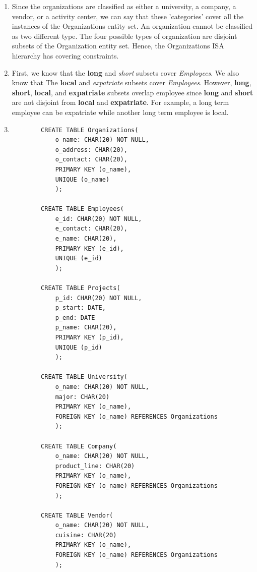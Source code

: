\begin{enumerate}[label={(\alph*)}]
    \item Since the organizations are classified as either a university, a company, a vendor, or a activity center, we can say that these 'categories' cover all the instances of the Organizations entity set. An organization cannot be classified as two different type. The four possible types of organization are disjoint subsets of the Organization entity set. Hence, the Organizations ISA hierarchy has covering constraints. 
    
    \item First, we know that the \textbf{long} and \textit{short} subsets cover \textit{Employees}. We also know that The \textbf{local} and \textit{expatriate} subsets cover \textit{Employees}. However, \textbf{long}, \textbf{short}, \textbf{local}, and \textbf{expatriate} subsets overlap employee since \textbf{long} and \textbf{short} are not disjoint from \textbf{local} and \textbf{expatriate}. For example, a long term employee can be expatriate while another long term employee is local. 
    
    \item \begin{verbatim}
        CREATE TABLE Organizations(
            o_name: CHAR(20) NOT NULL,
            o_address: CHAR(20),
            o_contact: CHAR(20),
            PRIMARY KEY (o_name),
            UNIQUE (o_name)
            );
        
        CREATE TABLE Employees(
            e_id: CHAR(20) NOT NULL,
            e_contact: CHAR(20),
            e_name: CHAR(20),
            PRIMARY KEY (e_id),
            UNIQUE (e_id)
            );
            
        CREATE TABLE Projects(
            p_id: CHAR(20) NOT NULL,
            p_start: DATE,
            p_end: DATE
            p_name: CHAR(20),
            PRIMARY KEY (p_id),
            UNIQUE (p_id)
            );
        
        CREATE TABLE University(
            o_name: CHAR(20) NOT NULL,
            major: CHAR(20)
            PRIMARY KEY (o_name),
            FOREIGN KEY (o_name) REFERENCES Organizations 
            );
        
        CREATE TABLE Company(
            o_name: CHAR(20) NOT NULL,
            product_line: CHAR(20)
            PRIMARY KEY (o_name),
            FOREIGN KEY (o_name) REFERENCES Organizations 
            );
            
        CREATE TABLE Vendor(
            o_name: CHAR(20) NOT NULL,
            cuisine: CHAR(20)
            PRIMARY KEY (o_name),
            FOREIGN KEY (o_name) REFERENCES Organizations 
            );
            

\end{verbatim}
\end{enumerate}
